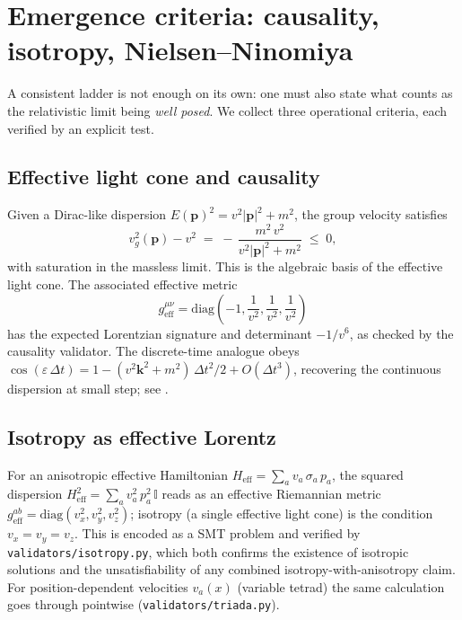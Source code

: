 \documentclass[a4paper,onecolumn,11pt]{quantumarticle}
\newcommand{\bbI}{\ensuremath{\mathbb{I}}}
\def\vk{\ensuremath{\bm{k}}}
\def\vp{\ensuremath{\bm{p}}}
\newcommand{\Hop}{\ensuremath{H}}
\begin{document}
\section{Emergence criteria: causality, isotropy, Nielsen--Ninomiya}
\label{p:criteria}

A consistent ladder is not enough on its own: one must also state what
counts as the relativistic limit being \emph{well posed}. We collect
three operational criteria, each verified by an explicit test.

\subsection{Effective light cone and causality}
Given a Dirac-like dispersion $E(\vp)^{2} = v^{2}\lvert\vp\rvert^{2}+m^{2}$, the
group velocity satisfies
\begin{equation}
v_{g}^{2}(\vp) - v^{2}
   \;=\; -\,\frac{m^{2}\,v^{2}}{v^{2}\lvert\vp\rvert^{2}+m^{2}} \;\le\; 0 ,
\label{p:eq:vg-bound}
\end{equation}
with saturation in the massless limit. This is the algebraic basis of
the effective light cone. The associated effective metric
\[
g^{\mu\nu}_{\mathrm{eff}}
  = \mathrm{diag}\!\left(-1,\frac{1}{v^{2}},\frac{1}{v^{2}},\frac{1}{v^{2}}\right)
\]
has the expected Lorentzian signature and determinant $-1/v^{6}$, as
checked by the causality validator. The discrete-time analogue obeys
$\cos(\varepsilon\,\Delta t) =
1-(v^{2}\vk^{2}+m^{2})\,\Delta t^{2}/2 + O(\Delta t^{3})$, recovering the
continuous dispersion at small step; see
.

\subsection{Isotropy as effective Lorentz}
For an anisotropic effective Hamiltonian
$\Hop_{\mathrm{eff}} = \sum_{a} v_{a}\,\sigma_{a}\,p_{a}$,
the squared dispersion
$\Hop_{\mathrm{eff}}^{2}=\sum_{a}v_{a}^{2}\,p_{a}^{2}\,\bbI$ reads as an
effective Riemannian metric
$g^{ab}_{\mathrm{eff}} = \mathrm{diag}(v_{x}^{2},v_{y}^{2},v_{z}^{2})$;
isotropy (a single effective light cone) is the condition
$v_{x}=v_{y}=v_{z}$. This is encoded as a SMT problem and verified by
\texttt{validators/isotropy.py}, which both confirms the existence of
isotropic solutions and the unsatisfiability of any combined
isotropy-with-anisotropy claim. For position-dependent velocities
$v_{a}(x)$ (variable tetrad) the same calculation goes through pointwise
(\texttt{validators/triada.py}).
\end{document}
